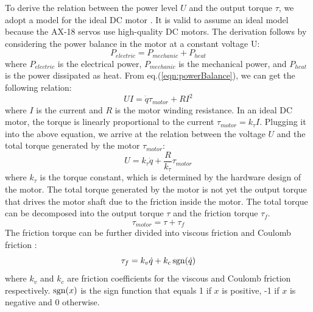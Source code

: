 To derive the relation between the power level $U$ and the output torque $\tau$, we adopt a model for the ideal DC motor \cite{SchwarzB:2013}. It is valid to assume an ideal model because the AX-18 servos use high-quality DC motors. The derivation follows by considering the power balance in the motor at a constant voltage U:
\begin{equation}
  P_{electric} = P_{mechanic} + P_{heat}
  \label{eqn:powerBalance}
\end{equation}
where $P_{electric}$ is the electrical power, $P_{mechanic}$ is the mechanical power, and $P_{heat}$ is the power dissipated as heat. From eq.(\ref{eqn:powerBalance}), we can get the following relation:
\begin{equation}
UI=\dot{q}\tau_{motor} + RI^2
\end{equation}
where $I$ is the current and $R$ is the motor winding resistance. In an ideal DC motor, the torque is linearly proportional to the current $\tau_{motor}=k_{\tau}I$. Plugging it into the above equation, we arrive at the relation between the voltage $U$ and the total torque generated by the motor $\tau_{motor}$:
\begin{equation}
  U=k_{\tau}\dot{q}+\frac{R}{k_{\tau}}\tau_{motor}
  \label{eqn:votageTorqueRelation}
\end{equation}
where $k_{\tau}$ is the torque constant, which is determined by the hardware design of the motor. The total torque generated by the motor is not yet the output torque that drives the motor shaft due to the friction inside the motor. The total torque can be decomposed into the output torque $\tau$ and the friction torque $\tau_f$.
\begin{equation}
  \tau_{motor}=\tau+\tau_f
  \label{eqn:torqueBalance}
\end{equation}
The friction torque can be further divided into viscous friction and Coulomb friction \cite{SchwarzB:2013}:
\begin{equation}
  \tau_f = k_v\dot{q}+k_c\operatorname{sgn}(\dot{q})
  \label{eqn:frictionComponents}
\end{equation}
where $k_v$ and $k_c$ are friction coefficients for the viscous and Coulomb friction respectively. $\operatorname{sgn}(x)$ is the sign function that equals 1 if $x$ is positive, -1 if $x$ is negative and 0 otherwise.

